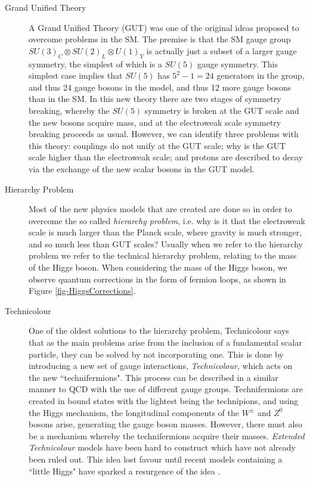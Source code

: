\begin{description}
	\item[Grand Unified Theory] A Grand Unified Theory (GUT) was one of the original ideas proposed to overcome problems in the SM. The premise is that the SM gauge group $SU(3)_C \otimes SU(2)_L \otimes U(1)_Y$ is actually just a subset of a larger gauge symmetry, the simplest of which is a $SU(5)$ gauge symmetry. This simplest case implies that $SU(5)$ has $5^2 - 1 = 24$ generators in the group, and thus 24 gauge bosons in the model, and thus 12 more gauge bosons than in the SM. In this new theory there are two stages of symmetry breaking, whereby the $SU(5)$ symmetry is broken at the GUT scale and the new bosons acquire mass, and at the electroweak scale symmetry breaking proceeds as usual. However, we can identify three problems with this theory: couplings do not unify at the GUT scale; why is the GUT scale higher than the electroweak scale; and protons are described to decay via the exchange of the new scalar bosons in the GUT model.
	\item[Hierarchy Problem] Most of the new physics models that are created are done so in order to overcome the so called \emph{hierarchy problem}, i.e. why is it that the electroweak scale is much larger than the Planck scale, where gravity is much stronger, and so much less than GUT scales? Usually when we refer to the hierarchy problem we refer to the technical hierarchy problem, relating to the mass of the Higgs boson. When considering the mass of the Higgs boson, we observe quantum corrections in the form of fermion loops, as shown in Figure \ref{fig-HiggsCorrections}. 
	\item[Technicolour] One of the oldest solutions to the hierarchy problem, Technicolour says that as the main problems arise from the inclusion of a fundamental scalar particle, they can be solved by not incorporating one. This is done by introducing a new set of gauge interactions, \emph{Technicolour}, which acts on the new ``technifermions". This process can be described in a similar manner to QCD with the use of different gauge groups. Technifermions are created in bound states with the lightest being the technipions, and using the Higgs mechanism, the longitudinal components of the $W^{\pm}$ and $Z^0$ bosons arise, generating the gauge boson masses. However, there must also be a mechanism whereby the technifermions acquire their masses. \emph{Extended Technicolour} models have been hard to construct which have not already been ruled out. This idea lost favour until recent models containing a ``little Higgs" have sparked a resurgence of the idea \cite{}.

\end{description}
